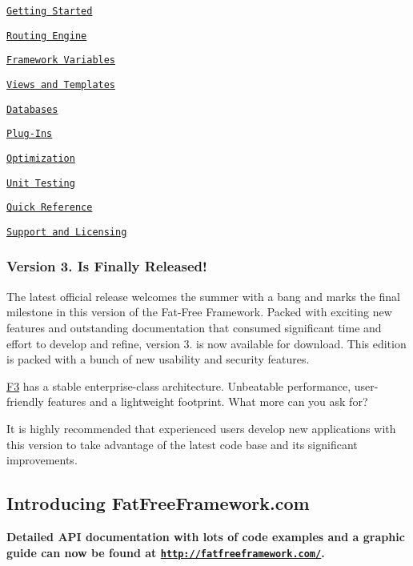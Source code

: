 \begin{DoxyItemize}
\item \href{#getting-started}{\tt Getting Started}
\item \href{#routing-engine}{\tt Routing Engine}
\item \href{#framework-variables}{\tt Framework Variables}
\item \href{#views-and-templates}{\tt Views and Templates}
\item \href{#databases}{\tt Databases}
\item \href{#plug-ins}{\tt Plug-\/\+Ins}
\item \href{#optimization}{\tt Optimization}
\item \href{#unit-testing}{\tt Unit Testing}
\item \href{#quick-reference}{\tt Quick Reference}
\item \href{#support-and-licensing}{\tt Support and Licensing}
\end{DoxyItemize}

\href{https://twitter.com/phpfatfree}{\tt }

\subsubsection*{Version 3. Is Finally Released!}

The latest official release welcomes the summer with a bang and marks the final milestone in this version of the Fat-\/\+Free Framework. Packed with exciting new features and outstanding documentation that consumed significant time and effort to develop and refine, version 3. is now available for download. This edition is packed with a bunch of new usability and security features.

\hyperlink{class_f3}{F3} has a stable enterprise-\/class architecture. Unbeatable performance, user-\/friendly features and a lightweight footprint. What more can you ask for?

It is highly recommended that experienced users develop new applications with this version to take advantage of the latest code base and its significant improvements.

\subsection*{Introducing Fat\+Free\+Framework.\+com}

{\bfseries Detailed A\+PI documentation with lots of code examples and a graphic guide can now be found at \href{http://fatfreeframework.com/}{\tt http\+://fatfreeframework.\+com/}.}

